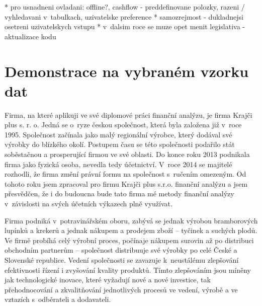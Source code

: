 * pro usnadneni ovladani: offline?, cashflow - preddefinovane polozky, razeni / vyhledavani v~tabulkach, uzivatelske preference
* samozrejmost - dukladnejsi osetreni uzivatelskych vstupu
* v~dalsim roce se muze opet menit legislativa - aktualizace kodu

\section{Demonstrace na vybraném vzorku dat}
Firma, na které aplikuji ve své diplomové práci finanční analýzu, je firma Krajči plus s. r. o. Jedná se o~ryze českou společnost, která byla založena již v~roce 1995. Společnost začínala
jako malý regionální výrobce, který dodával své výrobky do blízkého okolí. Postupem času se této společnosti podařilo stát soběstačnou a prosperující firmou ve své oblasti. Do konce roku 2013 podnikala firma jako fyzická osoba, nevedla tedy účetnictví. V~roce 2014 se majitelé rozhodli, že firma změní právní formu na společnost s~ručením omezeným. Od tohoto roku jsem zpracoval pro firmu Krajči plus s.r.o. finanční analýzu a jsem přesvědčen, že i do budoucna bude tato firma mé metody finanční analýzy v~závislosti na svých účetních výkazech plně využívat.

Firma podniká v~potravinářském oboru, zabývá se jednak výrobou bramborových lupínků a krekerů a jednak nákupem a prodejem zboží – tyčinek a suchých plodů. Ve firmě probíhá celý výrobní proces, počínaje nákupem surovin až po distribuci obchodním partnerům – společnost distribuuje své výrobky po celé České a Slovenské republice. Vedení společnosti se zavazuje k~neustálému zlepšování efektivnosti řízení i zvyšování kvality produktů. Tímto zlepšováním jsou míněny jak technologické inovace, které vyžadují nové a nové investice, tak přehodnocování a zkvalitňování jednotlivých procesů ve vedení, výrobě a ve vztazích s~odběrateli a dodavateli.

